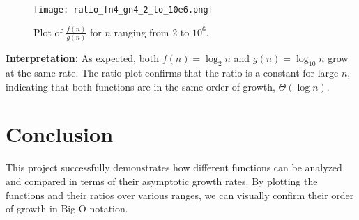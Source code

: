 \documentclass{article}
\begin{document}
\begin{figure}[H]
    \centering
    \texttt{[image: ratio\_fn4\_gn4\_2\_to\_10e6.png]}
    \caption{Plot of $\frac{f(n)}{g(n)}$ for $n$ ranging from 2 to $10^6$.}
    \label{fig:ratio_fn4_gn4_2_10e6}
\end{figure}

\textbf{Interpretation:} As expected, both $f(n) = \log_2 n$ and $g(n) = \log_{10} n$ grow at the same rate. The ratio plot confirms that the ratio is a constant for large $n$, indicating that both functions are in the same order of growth, $\Theta(\log n)$.

\section{Conclusion}

This project successfully demonstrates how different functions can be analyzed and compared in terms of their asymptotic growth rates. By plotting the functions and their ratios over various ranges, we can visually confirm their order of growth in Big-O notation.
\end{document}
